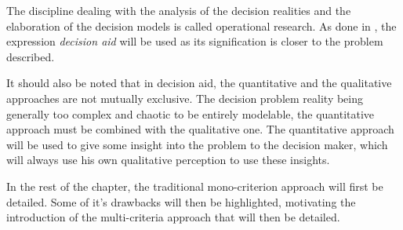 The discipline dealing with the analysis of the decision realities and the elaboration of the decision models is called operational research.
As done in \cite{Bertrand2002}, the expression \textit{decision aid} will be used as its signification is closer to the problem described.

It should also be noted that in decision aid, the quantitative and the qualitative approaches are not mutually exclusive.
The decision problem reality being generally too complex and chaotic to be entirely modelable, the quantitative approach must be combined with the qualitative one. The quantitative approach will be used to give some insight into the problem to the decision maker, which will always use his own qualitative perception  to use these insights.

In the rest of the chapter, the traditional mono-criterion approach will first be detailed. Some of it's drawbacks will then be highlighted, motivating the introduction of the multi-criteria approach that will then be detailed.

%
%
%
%

